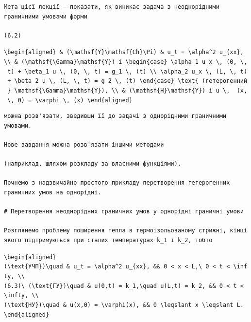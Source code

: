 \documentclass[
  ukrainian,
]{article}
\begin{document}
\begin{verbatim}
Мета цієї лекції — показати, як виникає задача з неоднорідними граничними умовами форми

(6.2)
\end{verbatim}

\texttt{\textbackslash{}begin\{aligned\}\ \&\ (\textbackslash{}mathsf\{Y\}\textbackslash{}mathsf\{Ch\}\textbackslash{}Pi)\ \&\ u\_t\ =\ \textbackslash{}alpha\^{}2\ u\_\{xx\},\ \textbackslash{}\textbackslash{}\ \&\ (\textbackslash{}mathsf\{\textbackslash{}Gamma\}\textbackslash{}mathsf\{Y\})\ і\ \textbackslash{}begin\{case\}\ \textbackslash{}alpha\_1\ u\_x\ \textbackslash{},\ (0,\ \textbackslash{},\ t)\ +\ \textbackslash{}beta\_1\ u\ \textbackslash{},\ (0,\ \textbackslash{},\ t)\ =\ g\_1\ \textbackslash{},\ (t)\ \textbackslash{}\textbackslash{}\ \textbackslash{}alpha\_2\ u\_x\ \textbackslash{},\ (L,\ \textbackslash{},\ t)\ +\ \textbackslash{}beta\_2\ u\ \textbackslash{},\ (L,\ \textbackslash{},\ t)\ =\ g\_2\ \textbackslash{},\ (t)\ \textbackslash{}end\{case\}\ \textbackslash{}text\{\ (гетерогенний\ \}\ \textbackslash{}mathsf\{\textbackslash{}Gamma\}\textbackslash{}mathsf\{Y\}),\ \textbackslash{}\textbackslash{}\ \&\ (\textbackslash{}mathsf\{H\}\textbackslash{}mathsf\{Y\})\ і\ u\ \textbackslash{},\ \ (x,\ \textbackslash{},\ 0)\ =\ \textbackslash{}varphi\ \textbackslash{},\ (x)\ \textbackslash{}end\{aligned\}}

\begin{verbatim}
можна розв'язати, зведивши її до задачі з однорідними граничними умовами.

Нове завдання можна розв'язати іншими методами

(наприклад, шляхом розкладу за власними функціями).

Почнемо з надзвичайно простого прикладу перетворення гетерогенних граничних умов на однорідні.

# Перетворення неоднорідних граничних умов у однорідні граничні умови

Розглянемо проблему поширення тепла в термоізольованому стрижні, кінці якого підтримуються при сталих температурах k_1 і k_2, тобто
\end{verbatim}

\texttt{\textbackslash{}begin\{aligned\}}
\texttt{(\textbackslash{}text\{УЧП\})\textbackslash{}quad\ \&\ u\_t\ =\ \textbackslash{}alpha\^{}2\ u\_\{xx\},\ \&\&\ 0\ \textless{}\ x\ \textless{}\ L,\textbackslash{}\ 0\ \textless{}\ t\ \textless{}\ \textbackslash{}infty,\ \textbackslash{}\textbackslash{}}
\texttt{(6.3)\textbackslash{}\ (\textbackslash{}text\{ГУ\})\textbackslash{}quad\ \&\ u(0,t)\ =\ k\_1,\textbackslash{}quad\ u(L,t)\ =\ k\_2,\ \&\&\ 0\ \textless{}\ t\ \textless{}\ \textbackslash{}infty,\ \textbackslash{}\textbackslash{}}
\texttt{(\textbackslash{}text\{НУ\})\textbackslash{}quad\ \&\ u(x,0)\ =\ \textbackslash{}varphi(x),\ \&\&\ 0\ \textbackslash{}leqslant\ x\ \textbackslash{}leqslant\ L.}
\texttt{\textbackslash{}end\{aligned\}}
\end{document}
